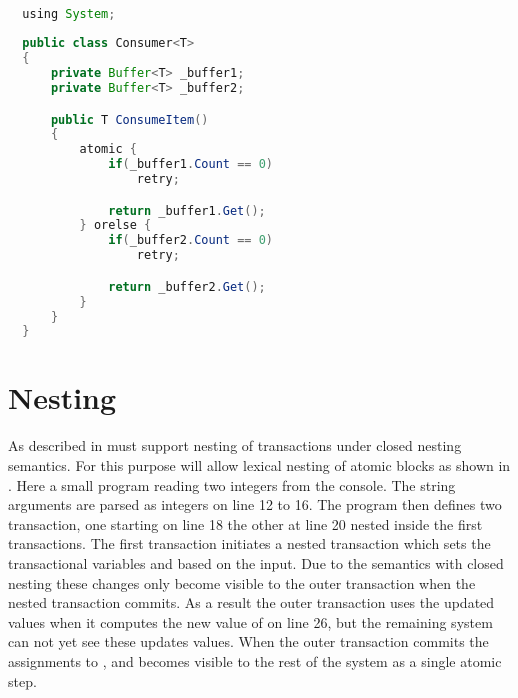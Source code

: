 \begin{lstlisting}[label=lst:stm_atomic_syntax_orelse,
  caption={OrElse Syntax},
  language=Java,  
  showspaces=false,
  showtabs=false,
  breaklines=true,
  showstringspaces=false,
  breakatwhitespace=true,
  commentstyle=\color{greencomments},
  keywordstyle=\color{bluekeywords},
  stringstyle=\color{redstrings},
  morekeywords={atomic, retry, orelse, var, get, set, using}]  % Start your code-block

  using System;
  
  public class Consumer<T>
  {
      private Buffer<T> _buffer1;
      private Buffer<T> _buffer2;

      public T ConsumeItem()
      {
          atomic {
              if(_buffer1.Count == 0)
                  retry;

              return _buffer1.Get();
          } orelse {
              if(_buffer2.Count == 0)
                  retry;

              return _buffer2.Get();
          }
      }
  }
\end{lstlisting}

\section{Nesting}\label{sec:nesting_design}
As described in  \stmnamesp must support nesting of transactions under closed nesting semantics. For this purpose \stmnamesp will allow lexical nesting of atomic blocks as shown in . Here a small program reading two integers from the console. The string arguments are parsed as integers on line 12 to 16. The program then defines two transaction, one starting on line 18 the other at line 20 nested inside the first transactions. The first transaction initiates a nested transaction which sets the transactional variables  and  based on the input. Due to the semantics with closed nesting these changes only become visible to the outer transaction when the nested transaction commits. As a result the outer transaction uses the updated values when it computes the new value of  on line 26, but the remaining system can not yet see these updates values. When the outer transaction commits the assignments to ,  and  becomes visible to the rest of the system as a single atomic step.

